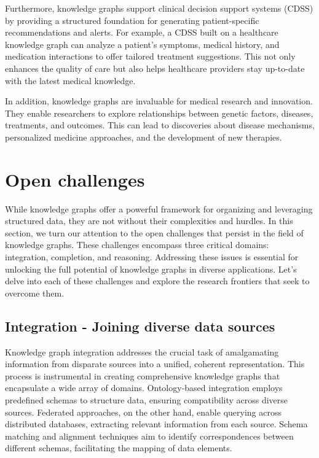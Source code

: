 \begin{itemize}
    Furthermore, knowledge graphs support clinical decision support systems (CDSS) by providing a structured foundation for generating patient-specific recommendations and alerts. For example, a CDSS built on a healthcare knowledge graph can analyze a patient's symptoms, medical history, and medication interactions to offer tailored treatment suggestions. This not only enhances the quality of care but also helps healthcare providers stay up-to-date with the latest medical knowledge.
    
    In addition, knowledge graphs are invaluable for medical research and innovation. They enable researchers to explore relationships between genetic factors, diseases, treatments, and outcomes. This can lead to discoveries about disease mechanisms, personalized medicine approaches, and the development of new therapies.
    
\end{itemize}

\section{Open challenges}\label{sec:kgs-challenges}
While knowledge graphs offer a powerful framework for organizing and leveraging structured data, they are not without their complexities and hurdles. In this section, we turn our attention to the open challenges that persist in the field of knowledge graphs. These challenges encompass three critical domains: integration, completion, and reasoning. Addressing these issues is essential for unlocking the full potential of knowledge graphs in diverse applications. Let's delve into each of these challenges and explore the research frontiers that seek to overcome them.

\subsection{Integration - Joining diverse data sources}
Knowledge graph integration addresses the crucial task of amalgamating information from disparate sources into a unified, coherent representation. This process is instrumental in creating comprehensive knowledge graphs that encapsulate a wide array of domains. Ontology-based integration employs predefined schemas to structure data, ensuring compatibility across diverse sources. Federated approaches, on the other hand, enable querying across distributed databases, extracting relevant information from each source. Schema matching and alignment techniques aim to identify correspondences between different schemas, facilitating the mapping of data elements.

